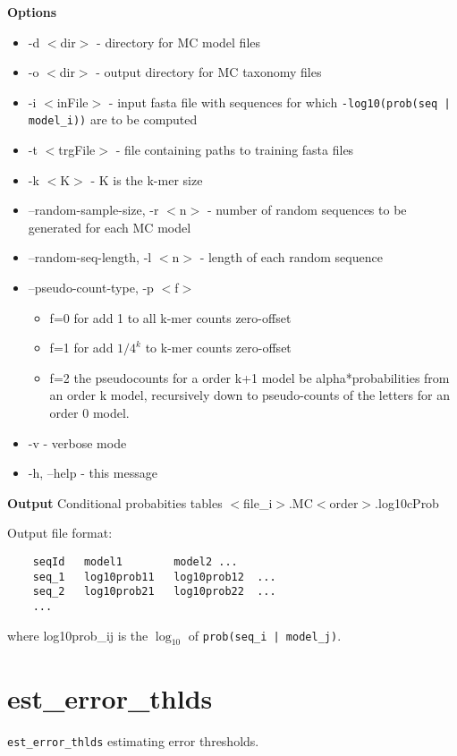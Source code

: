 \documentclass{article}
\newcommand{\logT}{\ensuremath{\log_{10}}\xspace}
\newcommand{\<}{\ensuremath{<}}
\renewcommand{\>}{\ensuremath{>}}
\begin{document}
\vspace{7pt}
\textbf{Options}
\tightlists
\begin{itemize}
\item -d \<dir\>     - directory for MC model files
\item -o \<dir\>     - output directory for MC taxonomy files
\item -i \<inFile\>  - input fasta file with sequences for which \verb+-log10(prob(seq | model_i))+ are to be computed
\item -t \<trgFile\> - file containing paths to training fasta files
\item -k \<K\>       - K is the k-mer size
\item --random-sample-size, -r \<n\> - number of random sequences to be generated
  for each MC model
\item --random-seq-length, -l \<n\>  - length of each random sequence
\item --pseudo-count-type, -p \<f\>
  \begin{itemize}
  \item f=0 for add 1 to all k-mer counts zero-offset
  \item f=1 for add $1/4^k$ to k-mer counts zero-offset
  \item f=2 the pseudocounts for a order k+1 model be alpha*probabilities from
    an order k model, recursively down to pseudo-counts of the letters for
    an order 0 model.
  \end{itemize}

\item -v - verbose mode
\item -h, --help      - this message
\end{itemize}

\vspace{5pt}
\noindent\textbf{Output} Conditional probabities tables \<file\_i\>.MC\<order\>.log10cProb

Output file format:
\begin{verbatim}
	seqId   model1        model2 ...
	seq_1   log10prob11   log10prob12  ...
	seq_2   log10prob21   log10prob22  ...
	...
\end{verbatim}
where log10prob\_ij is the \logT of  \verb+prob(seq_i | model_j)+.


\section*{est\_error\_thlds}

\verb+est_error_thlds+ estimating error thresholds.
\end{document}
